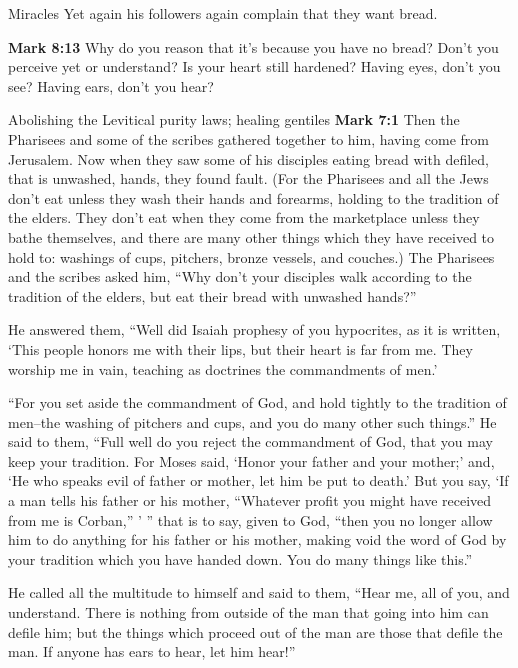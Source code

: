 \documentclass[10pt,twoside]{article} %
\newcommand{\quotesize}{\normalsize{}}
\newcommand{\comm}[1]{\begingroup \color{black!50} #1\endgroup}
\newenvironment{quotetext}{\begingroup\quotesize}{\endgroup}
\newcommand{\bible}[2]{\begin{quotetext}\textbf{#1} #2\end{quotetext}}
\newcommand{\gospelmark}[2]{\bible{Mark #1}{#2}}
\begin{document}
\begin{section}{Miracles}
\comm{Yet again his followers again complain that they want bread.}

\gospelmark{8:13}{
Why do you reason that it's because you have no bread? Don't you perceive yet or understand? Is your heart still hardened?    Having eyes, don't you see? Having ears, don't you hear?
}

\end{section}

\begin{section}{Abolishing the Levitical purity laws; healing gentiles}
\gospelmark{7:1}{
 Then the Pharisees and some of the scribes gathered together to him, having come from Jerusalem.   Now when they saw some of his disciples eating bread with defiled, that is unwashed, hands, they found fault.   (For the Pharisees and all the Jews don't eat unless they wash their hands and forearms, holding to the tradition of the elders.   They don't eat when they come from the marketplace unless they bathe themselves, and there are many other things which they have received to hold to: washings of cups, pitchers, bronze vessels, and couches.)   The Pharisees and the scribes asked him, ``Why don't your disciples walk according to the tradition of the elders, but eat their bread with unwashed hands?''

  He answered them, ``Well did Isaiah prophesy of you hypocrites, as it is written,
`This people honors me with their lips,
but their heart is far from me.
   They worship me in vain,
teaching as doctrines the commandments of men.'

   ``For you set aside the commandment of God, and hold tightly to the tradition of men--the washing of pitchers and cups, and you do many other such things.''   He said to them, ``Full well do you reject the commandment of God, that you may keep your tradition.    For Moses said, `Honor your father and your mother;' and, `He who speaks evil of father or mother, let him be put to death.'    But you say, `If a man tells his father or his mother, ``Whatever profit you might have received from me is Corban,'' ' '' that is to say, given to God,    ``then you no longer allow him to do anything for his father or his mother,    making void the word of God by your tradition which you have handed down. You do many things like this.''

  He called all the multitude to himself and said to them, ``Hear me, all of you, and understand.    There is nothing from outside of the man that going into him can defile him; but the things which proceed out of the man are those that defile the man.    If anyone has ears to hear, let him hear!''

}
\end{section}
\end{document}
